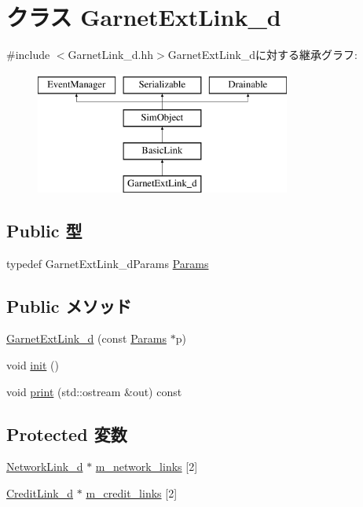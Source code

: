 \hypertarget{classGarnetExtLink__d}{
\section{クラス GarnetExtLink\_\-d}
\label{classGarnetExtLink__d}
}


{\ttfamily \#include $<$GarnetLink\_\-d.hh$>$}GarnetExtLink\_\-dに対する継承グラフ:\begin{figure}[H]
\begin{center}
\leavevmode
\includegraphics[height=4cm]{classGarnetExtLink__d}
\end{center}
\end{figure}
\subsection*{Public 型}
\begin{DoxyCompactItemize}
\item 
typedef GarnetExtLink\_\-dParams \hyperlink{classGarnetExtLink__d_a6260fe1aace0793dc83922905dbd435f}{Params}
\end{DoxyCompactItemize}
\subsection*{Public メソッド}
\begin{DoxyCompactItemize}
\item 
\hyperlink{classGarnetExtLink__d_a302fc1fbef96df5cd9992b1cf9326bf7}{GarnetExtLink\_\-d} (const \hyperlink{classGarnetExtLink__d_a6260fe1aace0793dc83922905dbd435f}{Params} $\ast$p)
\item 
void \hyperlink{classGarnetExtLink__d_a02fd73d861ef2e4aabb38c0c9ff82947}{init} ()
\item 
void \hyperlink{classGarnetExtLink__d_ac55fe386a101fbae38c716067c9966a0}{print} (std::ostream \&out) const 
\end{DoxyCompactItemize}
\subsection*{Protected 変数}
\begin{DoxyCompactItemize}
\item 
\hyperlink{classNetworkLink__d}{NetworkLink\_\-d} $\ast$ \hyperlink{classGarnetExtLink__d_ab17adecfd76f3cd9cdd715b6e49dc199}{m\_\-network\_\-links} \mbox{[}2\mbox{]}
\item 
\hyperlink{classCreditLink__d}{CreditLink\_\-d} $\ast$ \hyperlink{classGarnetExtLink__d_a860e58e5ab24bd1c98b1af5d9054ee8c}{m\_\-credit\_\-links} \mbox{[}2\mbox{]}
\end{DoxyCompactItemize}
